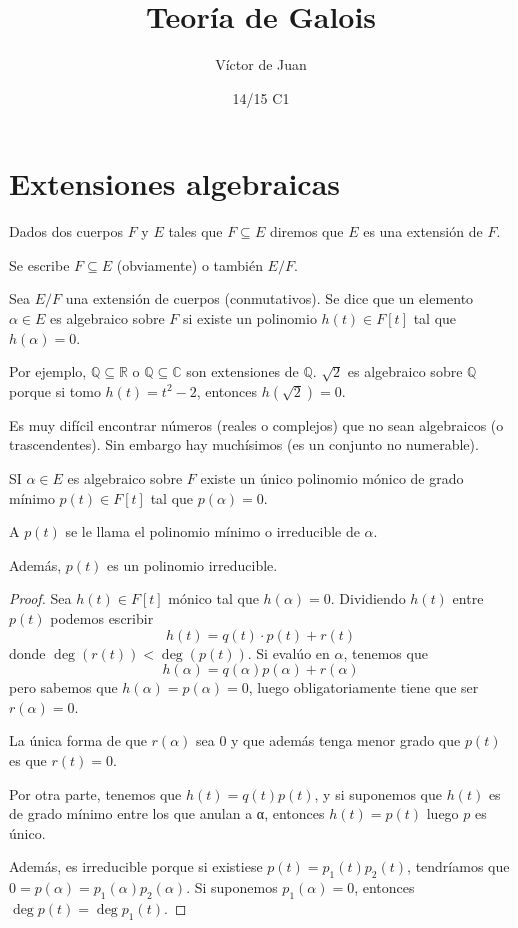 \documentclass{apuntes}
\title{Teoría de Galois}
\author{Víctor de Juan}
\date{14/15 C1}
\begin{document}
\pagestyle{plain}
\maketitle

\tableofcontents
\newpage

\chapter{Extensiones algebraicas}

\begin{defn}
Dados dos cuerpos $F$ y $E$ tales que $F⊆E$ diremos que $E$ es una extensión de $F$. 

Se escribe $F⊆E$ (obviamente) o también $E/F$.
\end{defn} 

\begin{defn}
Sea $E/F$ una extensión de cuerpos (conmutativos). Se dice que un elemento $α∈E$ es algebraico sobre $F$ si existe un polinomio $h(t) ∈ F[t]$ tal que $h(α) = 0$.
\end{defn}

Por ejemplo, $ℚ⊆ℝ$ o $ℚ⊆ℂ$ son extensiones de $ℚ$. $\sqrt{2}$ es algebraico sobre $ℚ$ porque si tomo $h(t) = t^2 - 2$, entonces $h(\sqrt{2}) = 0$.

Es muy difícil encontrar números (reales o complejos) que no sean algebraicos (o trascendentes). Sin embargo hay muchísimos (es un conjunto no numerable).

\begin{prop} SI $α∈E$ es algebraico sobre $F$ existe un único polinomio mónico de grado mínimo $p(t) ∈ F[t]$ tal que $p(α) = 0$. 

A $p(t)$ se le llama el polinomio mínimo o irreducible de $α$.

Además, $p(t)$ es un polinomio irreducible.
\end{prop}

\begin{proof}
Sea $h(t) ∈ F[t]$ mónico tal que $h(α) = 0$. Dividiendo $h(t)$ entre $p(t)$ podemos escribir \[ h(t) = q(t) · p(t) + r(t) \] donde $\deg(r(t)) < \deg(p(t))$. Si evalúo en $α$, tenemos que \[ h(α) = q(α)p(α) + r(α) \] pero sabemos que $h(α) = p(α) = 0$, luego obligatoriamente tiene que ser $r(α) = 0$.

La única forma de que $r(α)$ sea 0 y que además tenga menor grado que $p(t)$ es que $r(t) = 0$.

Por otra parte, tenemos que $h(t) = q(t)p(t)$, y si suponemos que $h(t)$ es de grado mínimo entre los que anulan a α, entonces $h(t) = p(t)$ luego $p$ es único.

Además, es irreducible porque si existiese $p(t) = p_1(t) p_2(t)$, tendríamos que $0 = p(α) = p_1(α) p_2(α)$. Si suponemos $p_1(α) = 0$, entonces $\deg p(t) = \deg p_1(t)$.
\end{proof}
\end{document}
